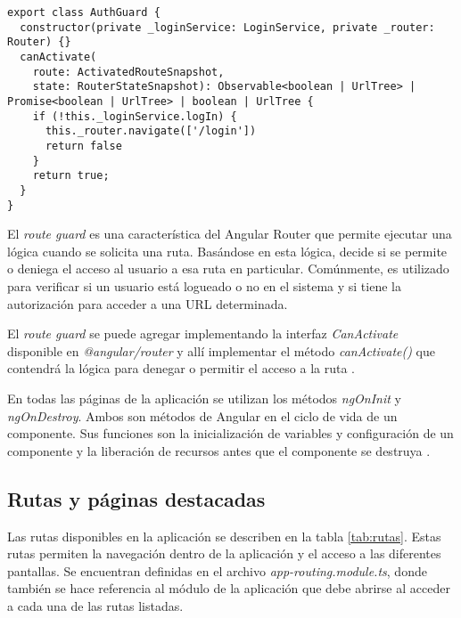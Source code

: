 \begin{lstlisting}[caption={Autenticación de rutas.}, label={lst:Autenticación de rutas}]
export class AuthGuard {
  constructor(private _loginService: LoginService, private _router: Router) {}
  canActivate(
    route: ActivatedRouteSnapshot,
    state: RouterStateSnapshot): Observable<boolean | UrlTree> | Promise<boolean | UrlTree> | boolean | UrlTree {
    if (!this._loginService.logIn) {
      this._router.navigate(['/login'])
      return false
    }
    return true;
  }
}
\end{lstlisting}

El \textit{route guard} es una característica del Angular Router que permite ejecutar una lógica cuando se solicita una ruta. Basándose en esta lógica, decide si se permite o deniega el acceso al usuario a esa ruta en particular. Comúnmente, es utilizado para verificar si un usuario está logueado o no en el sistema y si tiene la autorización para acceder a una URL determinada.

El \textit{route guard} se puede agregar implementando la interfaz \textit{CanActivate} disponible en \textit{@angular/router} y allí implementar el método \textit{canActivate()} que contendrá la lógica para denegar o permitir el acceso a la ruta \citep{31}.

En todas las páginas de la aplicación se utilizan los métodos \textit{ngOnInit} y \textit{ngOnDestroy}. Ambos son métodos de Angular en el ciclo de vida de un componente. Sus funciones son la inicialización de variables y configuración de un componente y la liberación de recursos antes que el componente se destruya \citep{32}.

\subsection{Rutas y páginas destacadas}

Las rutas disponibles en la aplicación se describen en la tabla \ref{tab:rutas}. Estas rutas permiten la navegación dentro de la aplicación y el acceso a las diferentes pantallas. Se encuentran definidas en el archivo \textit{app-routing.module.ts}, donde también se hace referencia al módulo de la aplicación que debe abrirse al acceder a cada una de las rutas listadas.

